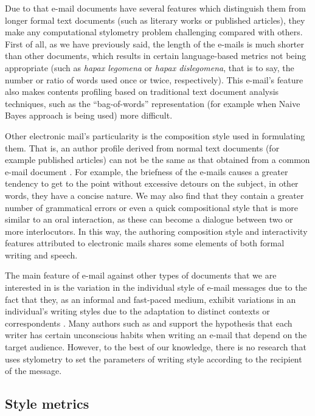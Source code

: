 Due to that e-mail documents have several features which distinguish them from longer formal text documents (such as literary works or published articles), they make any computational stylometry problem challenging compared with others. First of all, as we have previously said, the length of the e-mails is much shorter than other documents, which results in certain language-based metrics not being appropriate (such as \textit{hapax legomena} or \textit{hapax dislegomena}, that is to say, the number or ratio of words used once or twice, respectively). This e-mail's feature also makes contents profiling based on traditional text document analysis techniques, such as the ``bag-of-words'' representation (for example when Naive Bayes approach is being used) more difficult.

Other electronic mail's particularity is the composition style used in formulating them. That is, an author profile derived from normal text documents (for example published articles) can not be the same as that obtained from a common e-mail document \citep{de2001mining}. For example, the briefness of the e-mails causes a greater tendency to get to the point without excessive detours on the subject, in other words, they have a concise nature. We may also find that they contain a greater number of grammatical errors or even a quick compositional style that is more similar to an oral interaction, as these can become a dialogue between two or more interlocutors. In this way, the authoring composition style and interactivity features attributed to electronic mails shares some elements of both formal writing and speech.

The main feature of e-mail against other types of documents that we are interested in is the variation in the individual style of e-mail messages due to the fact that they, as an informal and fast-paced medium, exhibit variations in an individual's writing styles due to the adaptation to distinct contexts or correspondents \citep{argamon2003style}. Many authors such as \cite{allen1974methods} and \cite{de2001mining} support the hypothesis that each writer has certain unconscious habits when writing an e-mail that depend on the target audience. However, to the best of our knowledge, there is no research that uses stylometry to set the parameters of writing style according to the recipient of the message.

\subsection{Style metrics}\label{ssect:stymet}

